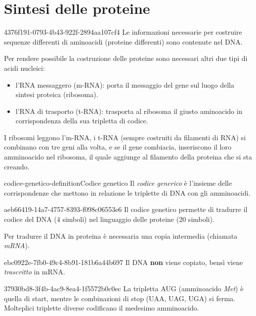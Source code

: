 \documentclass[preview]{standalone}
\begin{document}
\genpage

\section{Sintesi delle proteine}

\begin{snippet}{4376f191-0793-4b43-922f-2894aa107cf4}
    Le informazioni necessarie per costruire sequenze
    differenti di aminoacidi (proteine differenti) sono
    contenute nel DNA.
    
    Per rendere possibile la costruzione delle proteine sono
    necessari altri due tipi di acidi nucleici:
    
    \begin{itemize}
        \item l'RNA messaggero (m-RNA): porta il messaggio del
            gene sul luogo della sintesi proteica (ribosoma).
        \item l'RNA di trasporto (t-RNA): trasporta al ribosoma il
            giusto aminoacido in corrispondenza della sua
            tripletta di codice.
    \end{itemize}
    
    I ribosomi leggono l'm-RNA, i t-RNA (sempre costruiti da filamenti di RNA)
    si combinano con tre geni alla volta, e se il gene
    combiacia, inseriscono il loro amminoacido nel ribosoma, il quale
    aggiunge al filamento della proteina che si sta creando.
\end{snippet}


\begin{snippetdefinition}{codice-genetico-definition}{Codice genetico}
    Il \textit{codice generico} è l'insieme
    delle corrispondenze che mettono in
    relazione le triplette di DNA con gli amminoacidi.
\end{snippetdefinition}

\begin{snippet}{aeb66419-14a7-4757-8393-f098c06553e6}
    Il codice genetico permette di tradurre il codice del DNA
    (4 simboli) nel linguaggio delle proteine (20 simboli).


    Per tradurre il DNA in proteina è necessaria una copia intermedia
    (chiamata \textit{mRNA}).
\end{snippet}

\begin{snippetnote}{ebc0922e-7fb0-49c4-8b91-181b6a44b697}{}
    Il DNA \textbf{non} viene copiato, bensì viene
    \textit{trascritto} in mRNA.
\end{snippetnote}

\begin{snippet}{37930bd8-3f4b-4ac9-8ea4-1f5572b0c0ec}
    La tripletta AUG (amminoacido \textit{Met}) è quella di start,
    mentre le combinazioni di stop (UAA, UAG, UGA) si ferma.
    Molteplici triplette diverse codificano il medesimo amminoacido.
\end{snippet}
\end{document}
